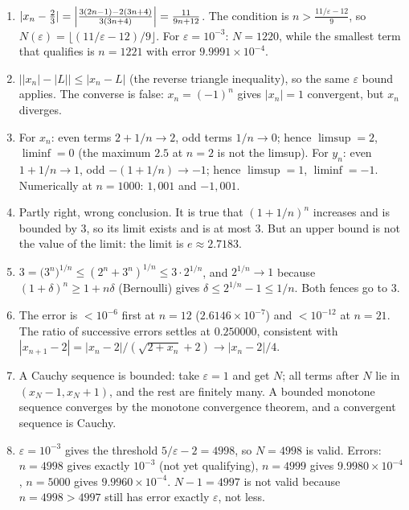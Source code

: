 \begin{enumerate}[label=\textbf{4.\arabic*}]
  \item $|x_{n}-\tfrac23|=\Bigl|\frac{3(2n-1)-2(3n+4)}{3(3n+4)}\Bigr|
        =\frac{11}{9n+12}$. The condition is $n>\frac{11/\varepsilon-12}{9}$, so
        $N(\varepsilon)=\bigl\lfloor(11/\varepsilon-12)/9\bigr\rfloor$. For
        $\varepsilon=10^{-3}$: $N=1220$, while the smallest term that qualifies is
        $n=1221$ with error $9. 9991\times10^{-4}$.

  \item $\bigl||x_{n}|-|L|\bigr|\le|x_{n}-L|$ (the reverse triangle inequality),
        so the same $\varepsilon$ bound applies. The converse is false:
        $x_{n}=(-1)^{n}$ gives $|x_{n}|=1$ convergent, but $x_{n}$ diverges.

  \item For $x_{n}$: even terms $2+1/n\to2$, odd terms $1/n\to0$; hence
        $\limsup=2$, $\liminf=0$ (the maximum $2. 5$ at $n=2$ is not the limsup). For
        $y_{n}$: even $1+1/n\to1$, odd $-(1+1/n)\to-1$; hence $\limsup=1$,
        $\liminf=-1$. Numerically at $n=1000$: $1{,}001$ and $-1{,}001$.

  \item Partly right, wrong conclusion. It is true that $(1+1/n)^{n}$ increases and
        is bounded by $3$, so its limit exists and is at most $3$. But an upper bound
        is not the value of the limit: the limit is $e\approx 2. 7183$.

  \item $3=\bigl(3^{n}\bigr)^{1/n}\le(2^{n}+3^{n})^{1/n}\le 3\cdot 2^{1/n}$, and
        $2^{1/n}\to1$ because $(1+\delta)^{n}\ge 1+n\delta$ (Bernoulli) gives
        $\delta\le 2^{1/n}-1\le 1/n$. Both fences go to $3$.

  \item The error is $<10^{-6}$ first at $n=12$ ($2. 6146\times10^{-7}$) and
        $<10^{-12}$ at $n=21$. The ratio of successive errors settles at $0. 250000$, consistent with
        $|x_{n+1}-2|=|x_{n}-2|/(\sqrt{2+x_{n}}+2)\to|x_{n}-2|/4$.

  \item A Cauchy sequence is bounded: take $\varepsilon=1$ and get $N$; all terms after $N$
        lie in $(x_{N}-1,x_{N}+1)$, and the rest are finitely many. A bounded monotone
        sequence converges by the monotone convergence theorem, and a convergent sequence
        is Cauchy.

  \item $\varepsilon=10^{-3}$ gives the threshold $5/\varepsilon-2=4998$, so
        $N=4998$ is valid. Errors: $n=4998$ gives exactly $10^{-3}$ (not yet qualifying), $n=4999$
        gives $9. 9980\times10^{-4}$, $n=5000$ gives $9. 9960\times10^{-4}$.
        $N-1=4997$ is not valid because $n=4998>4997$ still has error exactly
        $\varepsilon$, not less.


\end{enumerate}
